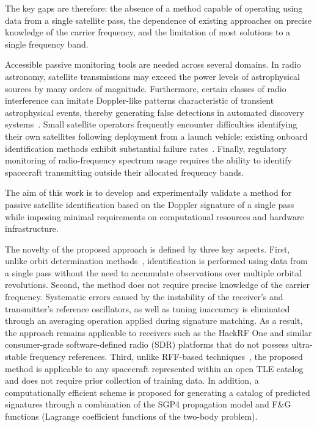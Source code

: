 \documentclass[lineno,pdflatex,sn-basic,referee,]{sn-jnl}
\begin{document}
The key gaps are therefore: the absence of a method capable of operating using data from a single satellite pass, the dependence of existing approaches on precise knowledge of the carrier frequency, and the limitation of most solutions to a single frequency band.

Accessible passive monitoring tools are needed across several domains. In radio astronomy, satellite transmissions may exceed the power levels of astrophysical sources by many orders of magnitude. Furthermore, certain classes of radio interference can imitate Doppler-like patterns characteristic of transient astrophysical events, thereby generating false detections in automated discovery systems~\citep{yang2026}. Small satellite operators frequently encounter difficulties identifying their own satellites following deployment from a launch vehicle: existing onboard identification methods exhibit substantial failure rates~\citep{skinner2022}. Finally, regulatory monitoring of radio-frequency spectrum usage requires the ability to identify spacecraft transmitting outside their allocated frequency bands.

The aim of this work is to develop and experimentally validate a method for passive satellite identification based on the Doppler signature of a single pass while imposing minimal requirements on computational resources and hardware infrastructure.

The novelty of the proposed approach is defined by three key aspects. First, unlike orbit determination methods~\citep{deng2024,spiridonov2021}, identification is performed using data from a single pass without the need to accumulate observations over multiple orbital revolutions. Second, the method does not require precise knowledge of the carrier frequency. Systematic errors caused by the instability of the receiver's and transmitter's reference oscillators, as well as tuning inaccuracy is eliminated through an averaging operation applied during signature matching. As a result, the approach remains applicable to receivers such as the HackRF One and similar consumer-grade software-defined radio (SDR) platforms that do not possess ultra-stable frequency references. Third, unlike RFF-based techniques~\citep{oligeri2020,orbid2025}, the proposed method is applicable to any spacecraft represented within an open TLE catalog and does not require prior collection of training data. In addition, a computationally efficient scheme is proposed for generating a catalog of predicted signatures through a combination of the SGP4 propagation model and F\&G functions (Lagrange coefficient functions of the two-body problem).
\end{document}
